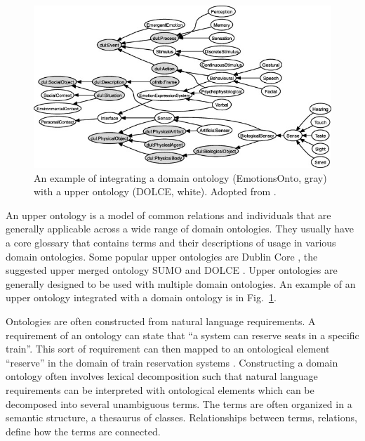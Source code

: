 \begin{figure}
	\includegraphics{upper_domain_interaction.jpg}
	\caption{An example of integrating a domain ontology
	(EmotionsOnto, gray) with a upper ontology (DOLCE, white).
	Adopted from \citep{gil2015emotions}.
	}
	\label{fig:upper_domain_integration}
\end{figure}

An upper ontology is a model of common relations and individuals that are generally
applicable across a wide range of domain ontologies. They usually have
a core glossary that contains terms and their descriptions of usage in various 
domain ontologies. Some popular upper ontologies are Dublin Core \citep{weibel1998dublin}, 
the suggested upper merged ontology SUMO \citep{pease2002suggested} and
DOLCE \citep{gangemi2002sweetening}. 
Upper ontologies are generally designed to be used with multiple domain ontologies. 
An example of an upper ontology integrated with a domain ontology is in 
Fig.~\ref{fig:upper_domain_integration}. 


Ontologies are often constructed from natural language requirements. 
A requirement of an ontology can state that ``a system can reserve seats in a specific train''. 
This sort of requirement can
then mapped to an ontological element ``reserve'' in the domain of 
train reservation systems \citep{kaiya2006using}.
Constructing a domain ontology often involves lexical decomposition
\citep{pustejovsky2013type} such that natural language requirements 
can be interpreted with ontological elements which can be decomposed 
into several unambiguous terms. The terms are often organized in a semantic structure,
a thesaurus of classes. Relationships between terms, relations, define how 
the terms are connected. 


